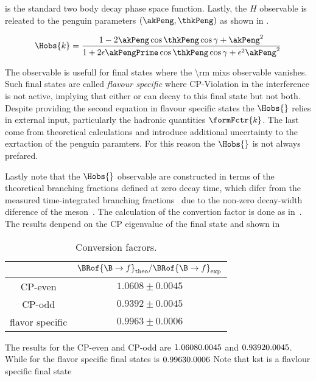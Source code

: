 \noindent is the standard two body decay phase space function. Lastly, the $H$ observable is releated to the penguin parameters
$(\akPeng,\thkPeng)$ as shown in .

\begin{equation}
\centering
  \Hobs{k} = \frac{1-2\akPeng\cos\thkPeng\cos\gamma + \akPeng^2}{1+2\epsilon\akPengPrime\cos\thkPeng\cos\gamma + \epsilon^2\akPeng^2}
\label{Hobs_peng_param}
\end{equation}

The observable is usefull for final states where the \Acp{\rm mix} observable vanishes. Such final states are called {\it flavour specific}
where CP-Violation in the interference is not active, implying that either \Bs or \Bsb can decay to this final state but not both.
Despite providing the second equation in flavour specific states the $\Hobs{}$ relies in external input, particularly the hadronic quantities $\formFctr{k}$.
The last come from theoretical calculations and introduce additional uncertainty to the exrtaction of the penguin paramters.
For this reason the $\Hobs{}$ is not always prefared.

Lastly note that the $\Hobs{}$ observable are constructed in terms of the theoretical branching fractions
defined at zero decay time, which difer from the measured time-integrated branching fractions~\cite{DeBruyn:2012wj}
due to the non-zero decay-width diference of the \Bs meson~\cite{hfag-2014}. The calculation of the convertion factor
is done as in~\cite{bsjpsikst-paper}. The results denpend on the CP eigenvalue of the final state and shown in

\begin{table}[!h]
  \center
  \begin{tabular}{c c }
    \hline
                        & $\BRof{\B\to f}_{\rm theo} / \BRof{\B\to f}_{\rm exp} $ \\
    \hline
      CP-even          &  $1.0608 \pm 0.0045$ \\
      CP-odd           &  $0.9392 \pm 0.0045$ \\
      flavor specific  &  $0.9963 \pm 0.0006$ \\

    \hline
  \end{tabular}
  \caption{\small Conversion facrors.}
  \label{br_conversions}
\end{table}

\noindent The results for the CP-even and CP-odd are $1.0608 \rm 0.0045$ and  $0.9392 \rm 0.0045$.
While for the flavor specific final states is  $0.9963 \rm 0.0006$
Note that kst is a flavlour specific final state
